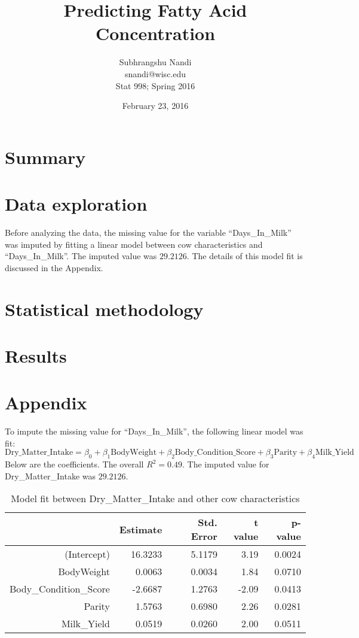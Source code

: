 \documentclass[12pt]{article}
\begin{document}
\title{Predicting Fatty Acid Concentration}

\author{Subhrangshu Nandi \\
	snandi@wisc.edu \\	
	Stat 998; Spring 2016}
\date{February 23, 2016}

\maketitle

\section*{Summary}\label{Sec_Summary}

\section*{Data exploration} \label{Sec_Data}
Before analyzing the data, the missing value for the variable ``Days\_In\_Milk'' was imputed by fitting a linear model between cow characteristics and ``Days\_In\_Milk''. The imputed value was $29.2126$. The details of this model fit is discussed in the Appendix. 

\section*{Statistical methodology} \label{Sec_Methods}

\section*{Results} \label{Sec_Results}

\newpage
\section*{Appendix} \label{Appendix}
To impute the missing value for ``Days\_In\_Milk'', the following linear model was fit:
\[ \text{Dry\_Matter\_Intake} = \beta_0 + \beta_1 \text{BodyWeight} + \beta_2 \text{Body\_Condition\_Score} + \beta_3 \text{Parity} + \beta_4 \text{Milk\_Yield}  \]
Below are the coefficients. The overall $R^2 = 0.49$. The imputed value for Dry\_Matter\_Intake was $29.2126$. 
\begin{table}[ht]
\centering
\begin{tabular}{rrrrr}
  \hline
  & Estimate & Std. Error & t value & p-value \\ 
  \hline
 (Intercept) & 16.3233 & 5.1179 & 3.19 & 0.0024 \\ 
  BodyWeight & 0.0063 & 0.0034 & 1.84 & 0.0710 \\ 
  Body\_Condition\_Score & -2.6687 & 1.2763 & -2.09 & 0.0413 \\ 
  Parity & 1.5763 & 0.6980 & 2.26 & 0.0281 \\ 
  Milk\_Yield & 0.0519 & 0.0260 & 2.00 & 0.0511 \\ 
  \hline
\end{tabular}
\caption{Model fit between Dry\_Matter\_Intake and other cow characteristics}
\end{table}
\end{document}

